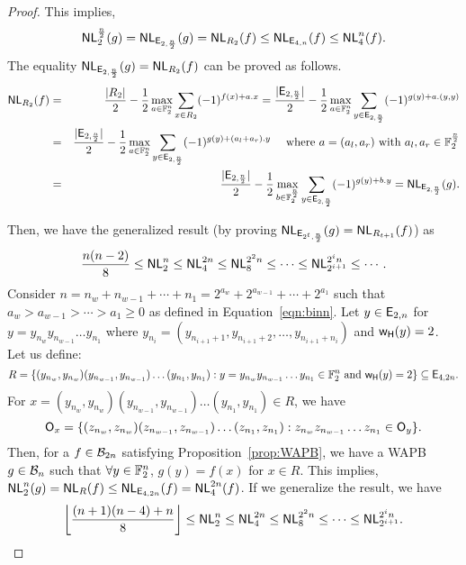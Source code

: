 \documentclass{llncs}
\begin{document}
\begin{proof}
This implies, 
$$\mathsf{NL}_{2}^{\frac{n}{2}}(g) = \mathsf{NL}_{\mathsf{E}_{2,\frac{n}{2}}}(g) = \mathsf{NL}_{R_2}(f) \leq \mathsf{NL}_{\mathsf{E}_{4,n}}(f) \leq \mathsf{NL}_{4}^{n}(f).$$ 
The equality $\mathsf{NL}_{\mathsf{E}_{2,\frac{n}{2}}}(g) = \mathsf{NL}_{R_2}(f)$ can be proved as follows.
\begin{eqnarray*}
\mathsf{NL}_{R_2}(f) & = & \frac{|R_2|}{2} - \frac{1}{2}\max\limits_{a \in \mathbb{F}_2^n}{\sum\limits_{x\in R_2} (-1)^{f(x)+a.x}} 
= \frac{|\mathsf{E}_{2,\frac{n}{2}}|}{2} - \frac{1}{2}\max\limits_{a \in \mathbb{F}_2^n}{\sum\limits_{y \in \mathsf{E}_{2,\frac{n}{2}}} (-1)^{g(y)+a.(y,y)}} \\
& = & \frac{|\mathsf{E}_{2,\frac{n}{2}}|}{2} - \frac{1}{2}\max\limits_{a \in \mathbb{F}_2^n}{\sum\limits_{y \in \mathsf{E}_{2,\frac{n}{2}}} (-1)^{g(y)+(a_l+a_r).y}} ~~~\text{ where } a = (a_l,a_r)\text{ with } a_l,a_r \in \mathbb{F}_2^{\frac{n}{2}}\\
& = & \frac{|\mathsf{E}_{2,\frac{n}{2}}|}{2} - \frac{1}{2}\max\limits_{b \in \mathbb{F}_2^{\frac{n}{2}}}{\sum\limits_{y \in \mathsf{E}_{2,\frac{n}{2}}} (-1)^{g(y)+b.y}} = \mathsf{NL}_{\mathsf{E}_{2,\frac{n}{2}}}(g).
\end{eqnarray*}


Then, we have the generalized result (by proving $\mathsf{NL}_{\mathsf{E}_{2^t,\frac{n}{2}}}(g) = \mathsf{NL}_{R_{t+1}}(f)$) as
$$ \frac{n(n-2)}{8} \leq \mathsf{NL}_{2}^n \leq \mathsf{NL}_{4}^{2n} \leq \mathsf{NL}_{8}^{2^{2}n } \leq \cdots \leq \mathsf{NL}_{2^{i+1}}^{2^{i}n} \leq \cdots.$$ 
Consider $n = n_w + n _{w-1} + \cdots + n_1 = 2^{a_w} + 2^{a_{w-1}} + \cdots + 2^{a_1}$ such that $ a_w > a_{w-1} > \cdots > a_1 \geq 0$ as defined in Equation~\ref{eqn:binn}. Let $y \in \mathsf{E}_{2,n}$ for  $y = y_{n_w} y_{n_{w-1}} \ldots y_{n_1}$ where $y_{n_i} = (y_{n_{i+1}+1},y_{n_{i+1}+2},\ldots , y_{n_{i+1}+n_i})$ and $\mathsf{w_H}(y)=2$. 
Let us define:
 $$R =\{(y_{n_w},y_{n_w})(y_{n_{w-1}},y_{n_{w-1}})\ldots (y_{n_1},y_{n_1}) : y = y_{n_w} y_{n_{w-1}} \ldots y_{n_1} \in \mathbb{F}_2^{n} \text{ and } \mathsf{w_H}(y) = 2 \} \subseteq \mathsf{E}_{4,2n}.$$ 
For $x =  (y_{n_w},y_{n_w})(y_{n_{w-1}},y_{n_{w-1}})\ldots (y_{n_1},y_{n_1}) \in R $, we have
$$ \mathsf{O}_x = \{(z_{n_w}, z_{n_w})(z_{n_{w-1}},z_{n_{w-1}})\ldots (z_{n_1},z_{n_1}) : z_{n_w} z_{n_{w-1}} \ldots z_{n_1} \in \mathsf{O}_y\}.$$
 Then, for a $ f \in \mathcal{B}_{2n}$ satisfying Proposition~\ref{prop:WAPB}, we have a WAPB $g \in \mathcal{B}_{n}$  such that $\forall y \in \mathbb{F}_2^{n}$,  $g(y) = f(x)$ for $ x \in R$. This implies, $\mathsf{NL}_{2}^{n}(g) = \mathsf{NL}_{R}(f) \leq \mathsf{NL}_{\mathsf{E}_{4,2n}}(f) = \mathsf{NL}_{4}^{2n}(f)$. 
 If we generalize the result, we have
$$ \left\lfloor \frac{(n+1)(n-4)+n}{8}  \right\rfloor \leq \mathsf{NL}_{2}^n \leq \mathsf{NL}_{4}^{2n} \leq \mathsf{NL}_{8}^{2^{2}n } \leq \cdots \leq \mathsf{NL}_{2^{i+1}}^{2^{i}n}.$$
\end{proof}
\end{document}
